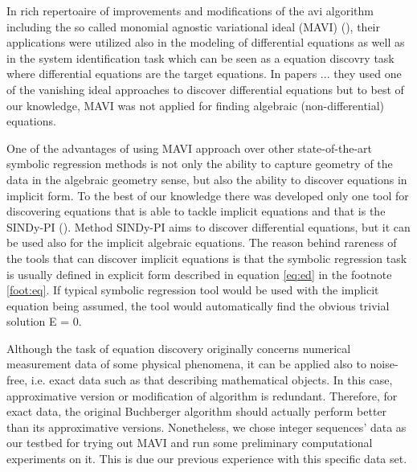 \documentclass[runningheads]{llncs}
\begin{document}
In rich repertoaire of improvements and modifications of the avi algorithm
including the so called monomial agnostic variational ideal (MAVI) (\cite{kera2023monomialagnostic}), 
their applications were utilized also in the modeling of differential
equations as well as in 
the system identification task which can be seen as a 
equation discovry task where differential equations are the target equations.
In  papers ... they used one of the vanishing ideal approaches  to 
discover differential equations but to best  of our knowledge, 
MAVI was not applied for finding algebraic (non-differential) equations.

One of the advantages of using MAVI approach over other state-of-the-art 
symbolic regression methods is not only the ability to capture geometry
of the data in the algebraic geometry sense, but also the ability to
discover equations in implicit form. 
To the best of our knowledge
there was developed only one tool for discovering equations that is
able to tackle implicit equations and that is the SINDy-PI (\cite{sindyPI}).
Method SINDy-PI aims to discover differential equations, but it can be
used also for the implicit algebraic equations.
The reason behind rareness of the tools that can discover implicit equations
is that the symbolic regression task is usually defined in explicit form 
described in equation \ref{eq:ed} in the footnote \ref{foot:eq}.
If typical symbolic regression tool would be used with the 
implicit equation being assumed, the tool would automatically
find the obvious trivial solution E = 0.

Although the task of equation discovery originally concerns numerical measurement
data of some physical phenomena, it can be applied also to noise-free, i.e. exact
data such as that describing mathematical objects.
In this case, approximative version or modification of algorithm is redundant.
Therefore, for exact data, the original Buchberger algorithm should actually perform
better than its approximative versions.
Nonetheless, we chose integer sequences' data as our testbed
for trying out MAVI and run some preliminary computational experiments on it.
This is due our previous experience with this specific data set.
\end{document}
